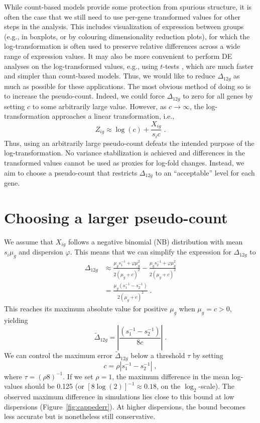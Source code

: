\documentclass[10pt,letterpaper]{article}
\begin{document}
While count-based models provide some protection from spurious structure, it is often the case that we still need to use per-gene transformed values for other steps in the analysis.
This includes visualization of expression between groups (e.g., in boxplots, or by colouring dimensionality reduction plots), for which the log-transformation is often used to preserve relative differences across a wide range of expression values.
It may also be more convenient to perform DE analyses on the log-transformed values, e.g., using $t$-tests \cite{law2014voom}, which are much faster and simpler than count-based models.
Thus, we would like to reduce $\Delta_{12g}$ as much as possible for these applications.
The most obvious method of doing so is to increase the pseudo-count.
Indeed, we could force $\Delta_{12g}$ to zero for all genes by setting $c$ to some arbitrarily large value.
However, as $c \to \infty$, the log-transformation approaches a linear transformation, i.e.,
\[
    Z_{ig} \approx \log(c) + \frac{X_{ig}}{s_i c} \;.
\]
Thus, using an arbitrarily large pseudo-count defeats the intended purpose of the log-transformation. 
No variance stabilization is achieved and differences in the transformed values cannot be used as proxies for log-fold changes. 
Instead, we aim to choose a pseudo-count that restricts $\Delta_{12g}$ to an ``acceptable'' level for each gene.

\section{Choosing a larger pseudo-count}
We assume that $X_{ig}$ follows a negative binomial (NB) distribution with mean $s_i\mu_g$ and dispersion $\varphi$.
This means that we can simplify the expression for $\Delta_{12g}$ to
\begin{align*}
\Delta_{12g} 
&\approx \frac{\mu_g s_1^{-1} + \varphi \mu_g^2}{2(\mu_g + c)^2} - \frac{\mu_g s_2^{-1} + \varphi \mu_g^2}{2(\mu_g + c)^2} \\ 
&= \frac{\mu_g (s_1^{-1} - s_2^{-1})}{2(\mu_g + c)^2} \;.
\end{align*}
This reaches its maximum absolute value for positive $\mu_g$ when $\mu_g = c > 0$, yielding 
\[
\tilde\Delta_{12g} = \left|\frac{(s_1^{-1} - s_2^{-1})}{8c}\right| \;.
\]
We can control the maximum error $\tilde\Delta_{12g}$ below a threshold $\tau$ by setting  
\[
    c = \rho |s_1^{-1} - s_2^{-1}| \;,
\]
where $\tau = (\rho 8)^{-1}$.
If we set $\rho = 1$, the maximum difference in the mean log-values should be 0.125 (or $[8\log(2)]^{-1} \approx 0.18$, on the $\log_2$-scale).
The observed maximum difference in simulations lies close to this bound at low dispersions (Figure~\ref{fig:cappederr}).
At higher dispersions, the bound becomes less accurate but is nonetheless still conservative.
\end{document}
